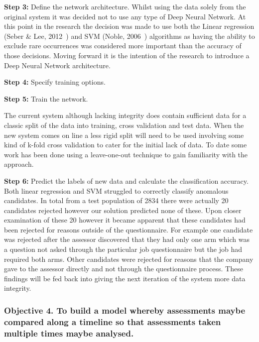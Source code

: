 \textbf{Step 3:} Define the network architecture. Whilst using the data solely from the original system it was decided not to use any type of Deep Neural Network. At this point in the research the decision was made to use both the Linear regression (Seber \& Lee, 2012~\cite{seber2012linear}) and SVM (Noble, 2006~\cite{noble2006support}) algorithms as having the ability to exclude rare occurrences was considered more important than the accuracy of those decisions. Moving forward it is the intention of the research to introduce a Deep Neural Network architecture.


\textbf{Step 4:} Specify training options.

\textbf{Step 5:} Train the network.

The current system although lacking integrity does contain sufficient data for a classic split of the data into training, cross validation and test data. When the new system comes on line a less rigid split will need to be used involving some kind of k-fold cross validation to cater for the initial lack of data. To date some work has been done using a leave-one-out technique to gain familiarity with the approach.

\textbf{Step 6:} Predict the labels of new data and calculate the classification accuracy. Both linear regression and SVM struggled to correctly classify anomalous candidates. In total from a test population of 2834 there were actually 20 candidates rejected however our solution predicted none of these. Upon closer examination of these 20 however it became apparent that these candidates had been rejected for reasons outside of the questionnaire. For example one candidate was rejected after the assessor discovered that they had only one arm which was a question not asked through the particular job questionnaire but the job had required both arms. Other candidates were rejected for reasons that the company gave to the assessor directly and not through the questionnaire process. These findings will be fed back into giving the next iteration of the system more data integrity.


\subsubsection{Objective 4. To build a model whereby assessments maybe compared along a timeline so that assessments taken multiple times maybe analysed.}

